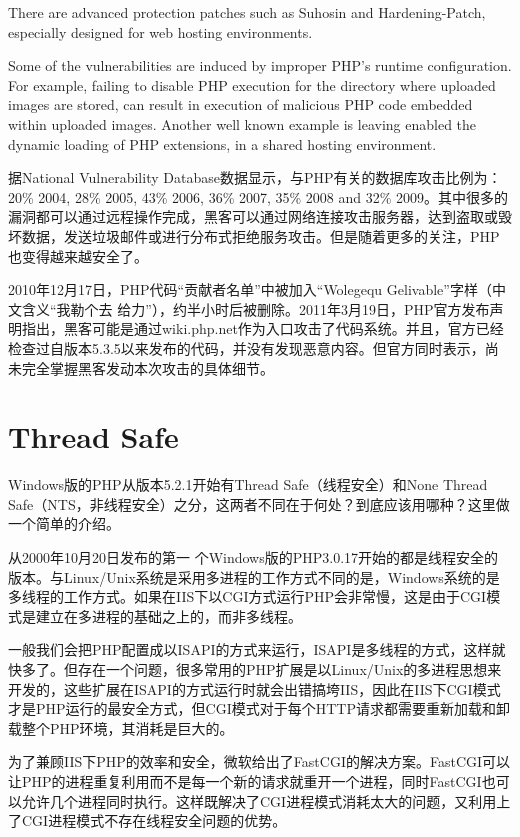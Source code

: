 There are advanced protection patches such as Suhosin and Hardening-Patch, especially designed for web hosting environments.

Some of the vulnerabilities are induced by improper PHP's runtime configuration. For example, failing to disable PHP execution for the directory where uploaded images are stored, can result in execution of malicious PHP code embedded within uploaded images. Another well known example is leaving enabled the dynamic loading of PHP extensions, in a shared hosting environment.

据National Vulnerability Database数据显示，与PHP有关的数据库攻击比例为：20\% 2004, 28\% 2005, 43\% 2006, 36\% 2007, 35\% 2008 and 32\% 2009。其中很多的漏洞都可以通过远程操作完成，黑客可以通过网络连接攻击服务器，达到盗取或毁坏数据，发送垃圾邮件或进行分布式拒绝服务攻击。但是随着更多的关注，PHP也变得越来越安全了。


2010年12月17日，PHP代码“贡献者名单”中被加入“Wolegequ Gelivable”字样（中文含义“我勒个去 给力”），约半小时后被删除。2011年3月19日，PHP官方发布声明指出，黑客可能是通过wiki.php.net作为入口攻击了代码系统。并且，官方已经检查过自版本5.3.5以来发布的代码，并没有发现恶意内容。但官方同时表示，尚未完全掌握黑客发动本次攻击的具体细节。


\section{Thread Safe}

Windows版的PHP从版本5.2.1开始有Thread Safe（线程安全）和None Thread Safe（NTS，非线程安全）之分，这两者不同在于何处？到底应该用哪种？这里做一个简单的介绍。

从2000年10月20日发布的第一 个Windows版的PHP3.0.17开始的都是线程安全的版本。与Linux/Unix系统是采用多进程的工作方式不同的是，Windows系统的是多线程的工作方式。如果在IIS下以CGI方式运行PHP会非常慢，这是由于CGI模式是建立在多进程的基础之上的，而非多线程。

一般我们会把PHP配置成以ISAPI的方式来运行，ISAPI是多线程的方式，这样就快多了。但存在一个问题，很多常用的PHP扩展是以Linux/Unix的多进程思想来开发的，这些扩展在ISAPI的方式运行时就会出错搞垮IIS，因此在IIS下CGI模式才是PHP运行的最安全方式，但CGI模式对于每个HTTP请求都需要重新加载和卸载整个PHP环境，其消耗是巨大的。

为了兼顾IIS下PHP的效率和安全，微软给出了FastCGI的解决方案。FastCGI可以让PHP的进程重复利用而不是每一个新的请求就重开一个进程，同时FastCGI也可以允许几个进程同时执行。这样既解决了CGI进程模式消耗太大的问题，又利用上了CGI进程模式不存在线程安全问题的优势。

